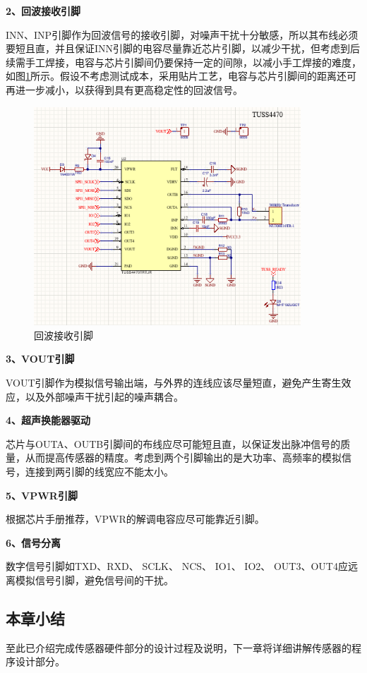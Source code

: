      \noindent
    \textbf{2、回波接收引脚}\par
    INN、INP引脚作为回波信号的接收引脚，对噪声干扰十分敏感，所以其布线必须要短且直，并且保证INN引脚的电容尽量靠近芯片引脚，以减少干扰，但考虑到后续需手工焊接，电容与芯片引脚间仍要保持一定的间隙，以减小手工焊接的难度，如图\ref{回波接收引脚}所示。假设不考虑测试成本，采用贴片工艺，电容与芯片引脚间的距离还可再进一步减小，以获得到具有更高稳定性的回波信号。
              \begin{figure}[ht]
        \centering
        \includegraphics[width=10cm]{figure/TUSS4470 peripheral circuit.png}
        \caption{回波接收引脚}
        \label{回波接收引脚}
    \end{figure}
     \noindent
    \textbf{3、VOUT引脚}\par
    VOUT引脚作为模拟信号输出端，与外界的连线应该尽量短直，避免产生寄生效应，以及外部噪声干扰引起的噪声耦合。\par
     \noindent
    \textbf{4、超声换能器驱动}\par
    芯片与OUTA、OUTB引脚间的布线应尽可能短且直，以保证发出脉冲信号的质量，从而提高传感器的精度。考虑到两个引脚输出的是大功率、高频率的模拟信号，连接到两引脚的线宽应不能太小。\par
    \noindent
     \textbf{5、VPWR引脚}\par
        根据芯片手册推荐，VPWR的解调电容应尽可能靠近引脚。\par
     \noindent
    \textbf{6、信号分离}\par
     数字信号引脚如TXD、RXD、 SCLK、 NCS、 
IO1、 IO2、 OUT3、OUT4应远离模拟信号引脚，避免信号间的干扰。\par
\subsection{本章小结}
至此已介绍完成传感器硬件部分的设计过程及说明，下一章将详细讲解传感器的程序设计部分。

      
    
    
    